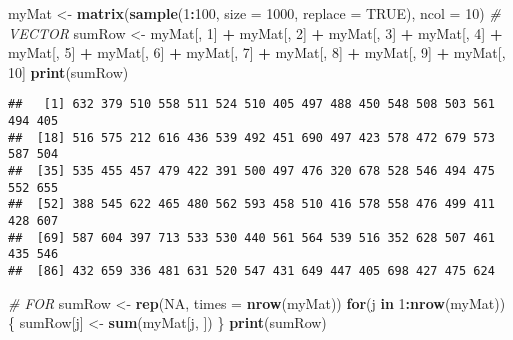 \documentclass[]{book}
\newenvironment{Shaded}{\begin{snugshade}}{\end{snugshade}}
\newcommand{\KeywordTok}[1]{\textcolor[rgb]{0.13,0.29,0.53}{\textbf{#1}}}
\newcommand{\DataTypeTok}[1]{\textcolor[rgb]{0.13,0.29,0.53}{#1}}
\newcommand{\DecValTok}[1]{\textcolor[rgb]{0.00,0.00,0.81}{#1}}
\newcommand{\StringTok}[1]{\textcolor[rgb]{0.31,0.60,0.02}{#1}}
\newcommand{\CommentTok}[1]{\textcolor[rgb]{0.56,0.35,0.01}{\textit{#1}}}
\newcommand{\OtherTok}[1]{\textcolor[rgb]{0.56,0.35,0.01}{#1}}
\newcommand{\ControlFlowTok}[1]{\textcolor[rgb]{0.13,0.29,0.53}{\textbf{#1}}}
\newcommand{\OperatorTok}[1]{\textcolor[rgb]{0.81,0.36,0.00}{\textbf{#1}}}
\newcommand{\NormalTok}[1]{#1}
\theoremstyle{definition}
\theoremstyle{definition}
\theoremstyle{definition}
\theoremstyle{remark}
\begin{document}
\begin{Shaded}
\begin{Highlighting}[]
\NormalTok{myMat <-}\StringTok{ }\KeywordTok{matrix}\NormalTok{(}\KeywordTok{sample}\NormalTok{(}\DecValTok{1}\OperatorTok{:}\DecValTok{100}\NormalTok{, }\DataTypeTok{size =} \DecValTok{1000}\NormalTok{, }\DataTypeTok{replace =} \OtherTok{TRUE}\NormalTok{), }\DataTypeTok{ncol =} \DecValTok{10}\NormalTok{)}
\CommentTok{# VECTOR}
\NormalTok{sumRow <-}\StringTok{ }\NormalTok{myMat[, }\DecValTok{1}\NormalTok{] }\OperatorTok{+}\StringTok{ }\NormalTok{myMat[, }\DecValTok{2}\NormalTok{] }\OperatorTok{+}\StringTok{ }\NormalTok{myMat[, }\DecValTok{3}\NormalTok{] }\OperatorTok{+}\StringTok{ }\NormalTok{myMat[, }\DecValTok{4}\NormalTok{] }\OperatorTok{+}\StringTok{ }
\StringTok{  }\NormalTok{myMat[, }\DecValTok{5}\NormalTok{] }\OperatorTok{+}\StringTok{ }\NormalTok{myMat[, }\DecValTok{6}\NormalTok{] }\OperatorTok{+}\StringTok{ }\NormalTok{myMat[, }\DecValTok{7}\NormalTok{] }\OperatorTok{+}\StringTok{ }\NormalTok{myMat[, }\DecValTok{8}\NormalTok{] }\OperatorTok{+}\StringTok{ }
\StringTok{  }\NormalTok{myMat[, }\DecValTok{9}\NormalTok{] }\OperatorTok{+}\StringTok{ }\NormalTok{myMat[, }\DecValTok{10}\NormalTok{]}
\KeywordTok{print}\NormalTok{(sumRow)}
\end{Highlighting}
\end{Shaded}

\begin{verbatim}
##   [1] 632 379 510 558 511 524 510 405 497 488 450 548 508 503 561 494 405
##  [18] 516 575 212 616 436 539 492 451 690 497 423 578 472 679 573 587 504
##  [35] 535 455 457 479 422 391 500 497 476 320 678 528 546 494 475 552 655
##  [52] 388 545 622 465 480 562 593 458 510 416 578 558 476 499 411 428 607
##  [69] 587 604 397 713 533 530 440 561 564 539 516 352 628 507 461 435 546
##  [86] 432 659 336 481 631 520 547 431 649 447 405 698 427 475 624
\end{verbatim}

\begin{Shaded}
\begin{Highlighting}[]
\CommentTok{# FOR}
\NormalTok{sumRow <-}\StringTok{ }\KeywordTok{rep}\NormalTok{(}\OtherTok{NA}\NormalTok{, }\DataTypeTok{times =} \KeywordTok{nrow}\NormalTok{(myMat))}
\ControlFlowTok{for}\NormalTok{(j }\ControlFlowTok{in} \DecValTok{1}\OperatorTok{:}\KeywordTok{nrow}\NormalTok{(myMat))\{}
\NormalTok{  sumRow[j] <-}\StringTok{ }\KeywordTok{sum}\NormalTok{(myMat[j, ])}
\NormalTok{\}}
\KeywordTok{print}\NormalTok{(sumRow)}
\end{Highlighting}
\end{Shaded}
\end{document}

